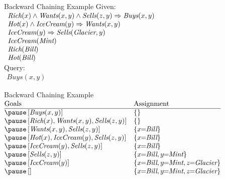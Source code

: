 \documentclass[14pt]{beamer}
\begin{document}
\begin{frame}{Backward Chaining Example}
	Given:
	\\[.5em]
	$
	\begin{array}{l}
		\textit{Rich}(x) \land \textit{Wants}(x, y) \land \textit{Sells}(z, y) \Rightarrow \textit{Buys}(x, y) \\
		\textit{Hot}(x) \land \textit{IceCream}(y) \Rightarrow \textit{Wants}(x, y) \\
		\textit{IceCream}(y) \Rightarrow \textit{Sells}(\textit{Glacier}, y) \\
		\textit{IceCream}(\textit{Mint}) \\
		\textit{Rich}(\textit{Bill}) \\
		\textit{Hot}(\textit{Bill})
	\end{array}
	$
	\\[1em]
	Query:
	\\[.5em]
	$
	\begin{array}{l}
		\textit{Buys}(x, y)
	\end{array}
	$
\end{frame}
\begin{frame}{Backward Chaining Example}
	\small
	$
	\begin{array}{@{}ll@{}}
		\mbox{Goals}                                                        & \mbox{Assignment} \\
		\hline
		\pause\left[\textit{Buys}(x, y)\right]                                  & \{\} \\
		\pause\left[\textit{Rich}(x), \textit{Wants}(x, y), \textit{Sells}(z, y)\right] & \{\} \\
		\pause\left[\textit{Wants}(x, y), \textit{Sells}(z, y)\right]               & \{x\!\!=\!\!\textit{Bill}\} \\
		\pause\left[\textit{Hot}(x), \textit{IceCream}(y), \textit{Sells}(z, y)\right]  & \{x\!\!=\!\!\textit{Bill}\} \\
		\pause\left[\textit{IceCream}(y), \textit{Sells}(z, y)\right]               & \{x\!\!=\!\!\textit{Bill}\} \\
		\pause\left[\textit{Sells}(z, y)\right]                                 & \{x\!\!=\!\!\textit{Bill}, y\!\!=\!\!\textit{Mint}\} \\
		\pause\left[\textit{IceCream}(y)\right]                                 & \{x\!\!=\!\!\textit{Bill}, y\!\!=\!\!\textit{Mint}, z\!\!=\!\!\textit{Glacier}\} \\
		\pause\left[\right]                                                 & \{x\!\!=\!\!\textit{Bill}, y\!\!=\!\!\textit{Mint}, z\!\!=\!\!\textit{Glacier}\} \\
	\end{array}
	$
\end{frame}
\end{document}
